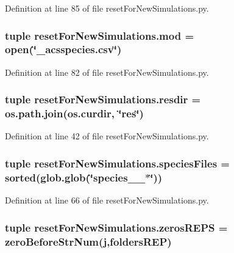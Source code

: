 Definition at line 85 of file reset\-For\-New\-Simulations.\-py.

\hypertarget{namespacereset_for_new_simulations_a7a0ded4bf7d86d876a380d82be3c66bd}{
\subsubsection[{mod}]{\setlength{\rightskip}{0pt plus 5cm}tuple reset\-For\-New\-Simulations.\-mod = open(\char`\"{}\-\_\-acsspecies.\-csv\char`\"{})}}\label{namespacereset_for_new_simulations_a7a0ded4bf7d86d876a380d82be3c66bd}


Definition at line 82 of file reset\-For\-New\-Simulations.\-py.

\hypertarget{namespacereset_for_new_simulations_addd72b08bf24570a2a851808a0b21949}{
\subsubsection[{resdir}]{\setlength{\rightskip}{0pt plus 5cm}tuple reset\-For\-New\-Simulations.\-resdir = os.\-path.\-join(os.\-curdir, \char`\"{}res\char`\"{})}}\label{namespacereset_for_new_simulations_addd72b08bf24570a2a851808a0b21949}


Definition at line 42 of file reset\-For\-New\-Simulations.\-py.

\hypertarget{namespacereset_for_new_simulations_a876ddf603699b40992ad784167b1121e}{
\subsubsection[{species\-Files}]{\setlength{\rightskip}{0pt plus 5cm}tuple reset\-For\-New\-Simulations.\-species\-Files = sorted(glob.\-glob(\char`\"{}species\-\_\-\_\-$\ast$\char`\"{}))}}\label{namespacereset_for_new_simulations_a876ddf603699b40992ad784167b1121e}


Definition at line 66 of file reset\-For\-New\-Simulations.\-py.

\hypertarget{namespacereset_for_new_simulations_a9f88ef39633f68b28f6b0e96d5ebb34c}{
\subsubsection[{zeros\-R\-E\-P\-S}]{\setlength{\rightskip}{0pt plus 5cm}tuple reset\-For\-New\-Simulations.\-zeros\-R\-E\-P\-S = {\bf zero\-Before\-Str\-Num}({\bf j},{\bf folders\-R\-E\-P})}}\label{namespacereset_for_new_simulations_a9f88ef39633f68b28f6b0e96d5ebb34c}


